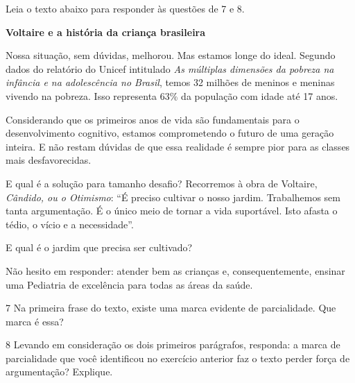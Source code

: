 Leia o texto abaixo para responder às questões de 7 e 8.

\begin{myquote}

\textbf{Voltaire e a história da criança brasileira}

Nossa situação, sem dúvidas, melhorou. Mas estamos longe do ideal. Segundo
dados do relatório do Unicef intitulado \textit{As múltiplas dimensões da pobreza na
infância e na adolescência no Brasil}, temos 32 milhões de meninos e meninas
vivendo na pobreza. Isso representa 63\% da população com idade até 17 anos.

Considerando que os primeiros anos de vida são fundamentais para o
desenvolvimento cognitivo, estamos comprometendo o futuro de uma geração
inteira. E não restam dúvidas de que essa realidade é sempre pior para as
classes mais desfavorecidas.

E qual é a solução para tamanho desafio? Recorremos à obra de
Voltaire, \textit{Cândido, ou o Otimismo}: ``É preciso cultivar o nosso jardim.
Trabalhemos sem tanta argumentação. É o único meio de tornar a vida
suportável. Isto afasta o tédio, o vício e a necessidade''.

E qual é o jardim que precisa ser cultivado? 

Não hesito em responder: atender bem as crianças e, consequentemente, ensinar
uma Pediatria de excelência para todas as áreas da saúde.


\end{myquote}

\num{7} Na primeira frase do texto, existe uma marca evidente de parcialidade.
Que marca é essa?


\num{8} Levando em consideração os dois primeiros parágrafos, responda: a marca de 
parcialidade que você identificou no exercício anterior faz o texto perder
força de argumentação? Explique.


